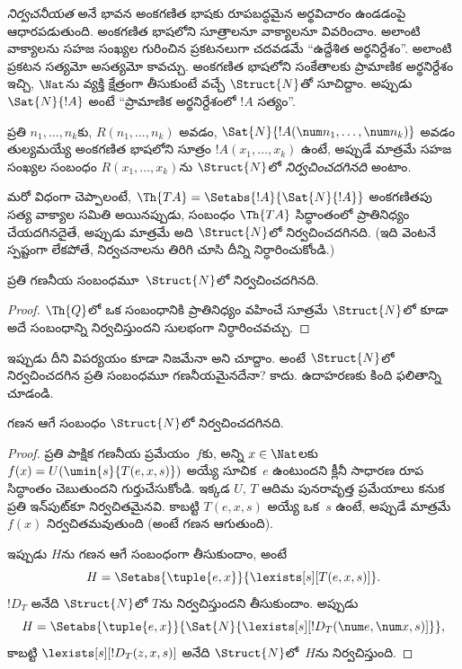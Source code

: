 \documentclass[../../../include/open-logic-section]{subfiles}
\begin{document}


\emph{నిర్వచనీయత} అనే భావన అంకగణిత భాషకు రూపబద్ధమైన అర్థవిచారం ఉండడంపై
ఆధారపడుతుంది. అంకగణిత భాషలోని సూత్రాలనూ వాక్యాలనూ వివరించాం.
అలాంటి వాక్యాలను సహజ సంఖ్యల గురించిన ప్రకటనలుగా చదవడమే ``ఉద్దేశిత అర్థనిర్దేశం''.
అలాంటి ప్రకటన సత్యమో అసత్యమో కావచ్చు. అంకగణిత భాషలోని
సంకేతాలకు ప్రామాణిక అర్థనిర్దేశం ఇచ్చి, $\Nat$ను వ్యక్తి క్షేత్రంగా తీసుకుంటే
వచ్చే  $\Struct{N}$తో సూచిద్దాం.
అప్పుడు $\Sat{N}{!A}$ అంటే ``ప్రామాణిక అర్థనిర్దేశంలో $!A$ సత్యం''.

\begin{defn}
ప్రతి $n_1,\dots,n_k$కు, $R(n_1,\dots,n_k)$ అవడం, $\Sat{N}{!A(\num
n_1,\dots,\num n_k)}$ అవడం తుల్యమయ్యే అంకగణిత భాషలోని సూత్రం
$!A(x_1,\dots,x_k)$ ఉంటే, అప్పుడే మాత్రమే సహజ సంఖ్యల సంబంధం
$R(x_1,\dots,x_k)$ను $\Struct{N}$లో \emph{నిర్వచించదగినది} అంటాం.
\end{defn}

మరో విధంగా చెప్పాలంటే, $\Th{TA} = \Setabs{!A}{\Sat{N}{!A}}$ అంకగణితపు
సత్య వాక్యాల సమితి అయినప్పుడు, సంబంధం $\Th{TA}$ సిద్ధాంతంలో ప్రాతినిధ్యం
చేయదగినదైతే, అప్పుడు మాత్రమే అది $\Struct{N}$లో నిర్వచించదగినది. (ఇది
వెంటనే స్పష్టంగా లేకపోతే, నిర్వచనాలను తిరిగి చూసి దీన్ని
నిర్ధారించుకోండి.)

\begin{lem}
ప్రతి గణనీయ సంబంధమూ~$\Struct{N}$లో నిర్వచించదగినది.
\end{lem}

\begin{proof}
$\Th{Q}$లో ఒక సంబంధానికి ప్రాతినిధ్యం వహించే సూత్రమే $\Struct{N}$లో కూడా
అదే సంబంధాన్ని నిర్వచిస్తుందని సులభంగా నిర్ధారించవచ్చు.
\end{proof}

ఇప్పుడు దీని విపర్యయం కూడా నిజమేనా అని చూద్దాం. అంటే $\Struct{N}$లో
నిర్వచించదగిన ప్రతి సంబంధమూ గణనీయమైనదేనా? కాదు. ఉదాహరణకు కింది ఫలితాన్ని చూడండి.

\begin{lem}
గణన ఆగే సంబంధం $\Struct{N}$లో నిర్వచించదగినది.
\end{lem}

\begin{proof}
ప్రతి పాక్షిక గణనీయ ప్రమేయం~$f$కు, అన్ని $x \in \Nat$లకు $f(x) =
U(\umin{s}{T(e,x,s)})$ అయ్యే సూచిక~$e$ ఉంటుందని క్లీనీ సాధారణ రూప
సిద్ధాంతం చెబుతుందని గుర్తుచేసుకోండి. ఇక్కడ $U$, $T$ ఆదిమ పునరావృత్త
ప్రమేయాలు కనుక ప్రతి ఇన్‌పుట్‌కూ నిర్వచితమైనవి. కాబట్టి $T(e,x,s)$ అయ్యే ఒక~$s$
ఉంటే, అప్పుడే మాత్రమే $f(x)$ నిర్వచితమవుతుంది (అంటే గణన ఆగుతుంది).

ఇప్పుడు $H$ను గణన ఆగే సంబంధంగా తీసుకుందాం, అంటే
\[
H = \Setabs{\tuple{e,x}}{\lexists[s][T(e, x, s)]}.
\]
$!D_T$ అనేది $\Struct{N}$లో $T$ను నిర్వచిస్తుందని తీసుకుందాం. అప్పుడు
\[
H = \Setabs{\tuple{e,x}}{\Sat{N}{\lexists[s][!D_T(\num e, \num x, s)]}},
\]
కాబట్టి $\lexists[s][!D_T(z, x, s)]$ అనేది $\Struct{N}$లో~$H$ను
నిర్వచిస్తుంది.
\end{proof}
\end{document}

